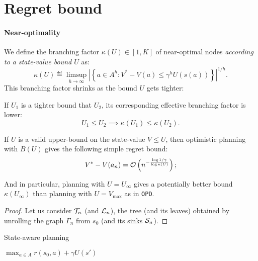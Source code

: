 \documentclass{article}
\begin{document}
\section{Regret bound}

\paragraph{Near-optimality}

We define the branching factor $\kappa(U)\in[1, K]$ of near-optimal nodes \emph{according to a state-value bound $U$} as:
\begin{equation}
    \kappa(U) \eqdef \limsup_{h\rightarrow\infty} \left|\left\{a\in A^h: V^* - V(a)\leq \gamma^{h}U(s(a))\right\}\right|^{1/h}.
\end{equation}
This branching factor shrinks as the bound $U$ gets tighter:
\begin{lemma}
If $U_1$ is a tighter bound that $U_2$, its corresponding effective branching factor is lower:
\[U_1\leq U_2\implies \kappa(U_1) \leq \kappa(U_2).\]
\end{lemma}


\begin{theorem}
If $U$ is a valid upper-bound on the state-value $V\leq U$, then optimistic planning with $B(U)$ gives the following simple regret bound: %
\begin{align*}
V^* - V({a_n}) = \mathcal{O}\left(n^{-\frac{\log 1/\gamma}{\log \kappa(U)}}\right);
\end{align*}
\end{theorem}

And in particular, planning with $U=U_\infty$ gives a potentially better bound $\kappa(U_\infty)$ than planning with $U=V_{\max}$ as in \texttt{OPD}.

\begin{proof}
Let us consider $\mathcal{T}_n$ (and $\mathcal{L}_n$), the tree (and its leaves) obtained by unrolling the graph $\Gamma_n$ from $s_0$ (and its sinks $\mathcal{S}_n$).
\end{proof}


\begin{algorithm}[htp]
  \caption{State-aware planning}
  \label{alg:state-aware}
  \SetAlgoLined\DontPrintSemicolon
  \Return $\max_{a\in A} r(s_0,a) + \gamma U(s')$\;
\end{algorithm}
\end{document}

